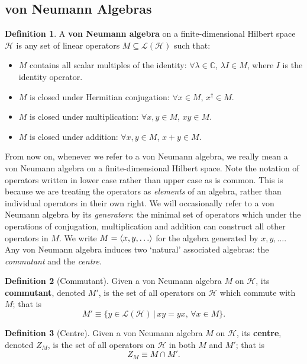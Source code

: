 \documentclass[12pt,a4paper]{report}
\numberwithin{equation}{section}
\theoremstyle{definition}
\newtheorem{definition}{Definition}[section]
\theoremstyle{theorem}
\theoremstyle{theorem}
\theoremstyle{example}
\theoremstyle{definition}
\begin{document}
\subsection{von Neumann Algebras}
\begin{definition}
	A \textbf{von Neumann algebra} on a finite-dimensional Hilbert space $\mathcal{H}$ is any set of linear operators $M\subseteq\mathcal{L}(\mathcal{H})$ such that:
	\begin{itemize}
		\item $M$ contains all scalar multiples of the identity: $\forall \lambda\in\mathbb{C}$, $\lambda I\in M$, where $I$ is the identity operator.
		\item $M$ is closed under Hermitian conjugation: $\forall x\in M$, $x^{\dagger}\in M$.
		\item $M$ is closed under multiplication: $\forall x,y\in M$, $xy\in M$.
		\item $M$ is closed under addition: $\forall x,y\in M$, $x+y\in M$.
	\end{itemize}
\end{definition}
From now on, whenever we refer to a von Neumann algebra, we really mean a von Neumann algebra on a finite-dimensional Hilbert space. Note the notation of operators written in lower case rather than upper case as is common. This is because we are treating the operators as \textit{elements} of an algebra, rather than individual operators in their own right. We will occasionally refer to a von Neumann algebra by its \textit{generators}: the minimal set of operators which under the operations of conjugation, multiplication and addition can construct all other operators in $M$. We write $M=\braket{x,y,\ldots}$ for the algebra generated by $x,y,\ldots$.\\
Any von Neumann algebra induces two `natural' associated algebras: the \textit{commutant} and the \textit{centre}.
\begin{definition}[Commutant]
	Given a von Neumann algebra $M$ on $\mathcal{H}$, its \textbf{commutant}, denoted $M'$, is the set of all operators on $\mathcal{H}$ which commute with $M$; that is
	\begin{equation}
		M'\equiv\{y\in\mathcal{L}(\mathcal{H})\,|\,xy=yx,\,\forall x\in M\}.
	\end{equation}
\end{definition}
\begin{definition}[Centre]
	Given a von Neumann algebra $M$ on $\mathcal{H}$, its \textbf{centre}, denoted $Z_{M}$, is the set of all operators on $\mathcal{H}$ in both $M$ and $M'$; that is
	\begin{equation}
		Z_{M}\equiv M\cap M'.
	\end{equation}
\end{definition}
\end{document}
